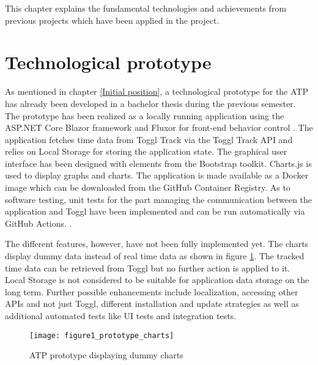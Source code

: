 
This chapter explains the fundamental technologies and achievements from previous projects which have been applied in the project.

\section{Technological prototype} \label{Prototype}
As mentioned in chapter \ref{Initial position}, a technological prototype for the ATP has already been developed in a bachelor thesis during the previous semester. The prototype has been realized as a locally running application using the ASP.NET Core Blazor framework and Fluxor for front-end behavior control \cite{bachelorarbeit_Egger_Verstappen_page4-7}. The application fetches time data from Toggl Track via the Toggl Track API and relies on Local Storage for storing the application state. The graphical user interface has been designed with elements from the Bootstrap toolkit. Charts.js is used to display graphs and charts. The application is made available as a Docker image which can be downloaded from the GitHub Container Registry. As to software testing, unit tests for the part managing the communication between the application and Toggl have been implemented and can be run automatically via GitHub Actions. \cite{bachelorarbeit_Egger_Verstappen_page23-25}.

The different features, however, have not been fully implemented yet. The charts display dummy data instead of real time data as shown in figure \ref{prototypeCharts}. The tracked time data can be retrieved from Toggl but no further action is applied to it. Local Storage is not considered to be suitable for application data storage on the long term. Further possible enhancements include localization, accessing other APIs and not just Toggl, different installation and update strategies as well as additional automated tests like UI tests and integration tests. \cite{bachelorarbeit_Egger_Verstappen_page26-27}

\begin{figure}[H]
\centering
\texttt{[image: figure1\_prototype\_charts]}
\caption{ATP prototype displaying dummy charts}
\label{prototypeCharts}
\end{figure}

